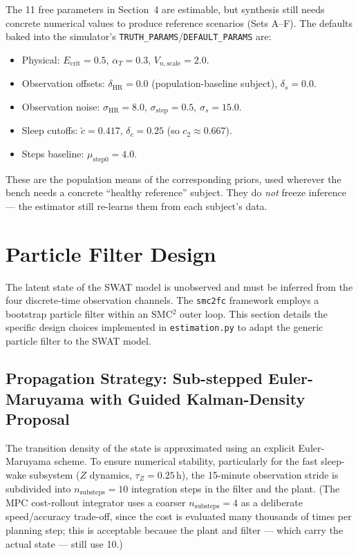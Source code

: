 \documentclass[11pt,a4paper]{article}
\begin{document}
The 11 free parameters in Section~4 are estimable, but synthesis still needs concrete numerical values to produce reference scenarios (Sets A--F). The defaults baked into the simulator's \texttt{TRUTH\_PARAMS}/\texttt{DEFAULT\_PARAMS} are:
\begin{itemize}
    \item Physical: $E_{\text{crit}} = 0.5$, $\alpha_T = 0.3$, $V_{n,\text{scale}} = 2.0$.
    \item Observation offsets: $\delta_{\text{HR}} = 0.0$ (population-baseline subject), $\delta_s = 0.0$.
    \item Observation noise: $\sigma_{\text{HR}} = 8.0$, $\sigma_{\text{step}} = 0.5$, $\sigma_s = 15.0$.
    \item Sleep cutoffs: $\tilde{c} = 0.417$, $\delta_c = 0.25$ (so $c_2 \approx 0.667$).
    \item Steps baseline: $\mu_{\text{step}0} = 4.0$.
\end{itemize}
These are the population means of the corresponding priors, used wherever the bench needs a concrete ``healthy reference'' subject. They do \textit{not} freeze inference --- the estimator still re-learns them from each subject's data.

\section{Particle Filter Design}

The latent state of the SWAT model is unobserved and must be inferred from the four discrete-time observation channels. The \texttt{smc2fc} framework employs a bootstrap particle filter within an SMC$^2$ outer loop. This section details the specific design choices implemented in \texttt{estimation.py} to adapt the generic particle filter to the SWAT model.

\subsection{Propagation Strategy: Sub-stepped Euler-Maruyama with Guided Kalman-Density Proposal}
The transition density of the state is approximated using an explicit Euler-Maruyama scheme. To ensure numerical stability, particularly for the fast sleep-wake subsystem ($Z$ dynamics, $\tau_Z = 0.25$\,h), the 15-minute observation stride is subdivided into $n_{\text{substeps}} = 10$ integration steps in the filter and the plant. (The MPC cost-rollout integrator uses a coarser $n_{\text{substeps}} = 4$ as a deliberate speed/accuracy trade-off, since the cost is evaluated many thousands of times per planning step; this is acceptable because the plant and filter --- which carry the actual state --- still use 10.)
\end{document}

